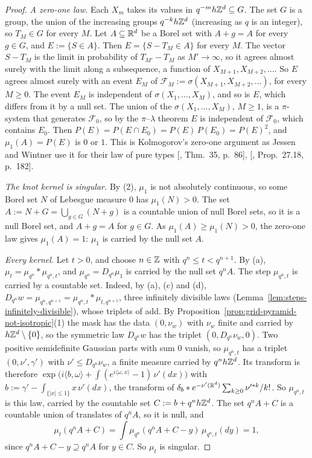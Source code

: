 \begin{proof}
\emph{A zero-one law.} Each $X_m$ takes its values in $q^{-m}h\mathbb{Z}^d \subseteq G$. The set $G$ is a
group, the union of the increasing groups $q^{-k}h\mathbb{Z}^d$ (increasing as $q$ is an integer), so
$T_M \in G$ for every $M$. Let $A \subseteq \mathbb{R}^d$ be a Borel set with $A + g = A$ for every
$g \in G$, and $E := \{S \in A\}$. Then $E = \{S - T_M \in A\}$ for every $M$. The vector
$S - T_M$ is the limit in probability of $T_{M'} - T_M$ as $M' \to \infty$, so it agrees almost
surely with the limit along a subsequence, a function of $X_{M+1}, X_{M+2}, \dots$. So $E$ agrees
almost surely with an event $E_M$ of $\mathcal{F}_M := \sigma(X_{M+1}, X_{M+2}, \dots)$, for every
$M \ge 0$. The event $E_M$ is independent of $\sigma(X_1, \dots, X_M)$, and so is $E$, which
differs from it by a null set. The union of the $\sigma(X_1, \dots, X_M)$, $M \ge 1$, is a
$\pi$-system that generates $\mathcal{F}_0$, so by the $\pi$--$\lambda$ theorem $E$ is independent
of $\mathcal{F}_0$, which contains $E_0$. Then $P(E) = P(E \cap E_0) = P(E)\,P(E_0) = P(E)^2$, and
$\mu_1(A) = P(E)$ is $0$ or $1$. This is Kolmogorov's zero-one argument as Jessen and Wintner use
it for their law of pure types [, Thm.~35, p.~86],
[, Prop.~27.18, p.~182].

\emph{The knot kernel is singular.} By (2), $\mu_1$ is not absolutely continuous, so some Borel set
$N$ of Lebesgue measure $0$ has $\mu_1(N) > 0$. The set $A := N + G = \bigcup_{g \in G}(N + g)$ is a
countable union of null Borel sets, so it is a null Borel set, and $A + g = A$ for $g \in G$. As
$\mu_1(A) \ge \mu_1(N) > 0$, the zero-one law gives $\mu_1(A) = 1$: $\mu_1$ is carried by the null
set $A$.

\emph{Every kernel.} Let $t > 0$, and choose $n \in \mathbb{Z}$ with $q^n \le t < q^{n+1}$. By (a),
$\mu_t = \mu_{q^n} * \mu_{q^n,t}$, and $\mu_{q^n} = D_{q^n}\mu_1$ is carried by the null set
$q^nA$. The step $\mu_{q^n,t}$ is carried by a countable set. Indeed, by (a), (c) and (d),
$D_{q^n}w = \mu_{q^n,q^{n+1}} = \mu_{q^n,t} * \mu_{t,q^{n+1}}$, three infinitely divisible laws
(Lemma~\ref{lem:steps-infinitely-divisible}), whose triplets of  add. By
Proposition~\ref{prop:grid-pyramid-not-isotropic}(1) the mask has the data $(0, \nu_w)$ with
$\nu_w$ finite and carried by $h\mathbb{Z}^d \setminus \{0\}$, so the symmetric law $D_{q^n}w$ has the
triplet $(0, D_{q^n}\nu_w, 0)$. Two positive semidefinite Gaussian parts with sum $0$ vanish, so
$\mu_{q^n,t}$ has a triplet $(0, \nu', \gamma')$ with $\nu' \le D_{q^n}\nu_w$, a finite measure
carried by $q^nh\mathbb{Z}^d$. Its transform is therefore
$\exp\bigl(i\langle b, \omega\rangle + \int(e^{i\langle\omega, x\rangle} - 1)\,\nu'(dx)\bigr)$ with
$b := \gamma' - \int_{\{|x| \le 1\}}x\,\nu'(dx)$, the transform of
$\delta_b * e^{-\nu'(\mathbb{R}^d)}\sum_{k \ge 0}\nu'^{*k}/k!$. So $\mu_{q^n,t}$ is this law, carried by
the countable set $C := b + q^nh\mathbb{Z}^d$. The set $q^nA + C$ is a countable union of translates of
$q^nA$, so it is null, and
\[
  \mu_t(q^nA + C) = \int\mu_{q^n}(q^nA + C - y)\,\mu_{q^n,t}(dy) = 1,
\]
since $q^nA + C - y \supseteq q^nA$ for $y \in C$. So $\mu_t$ is singular.


\end{proof}
